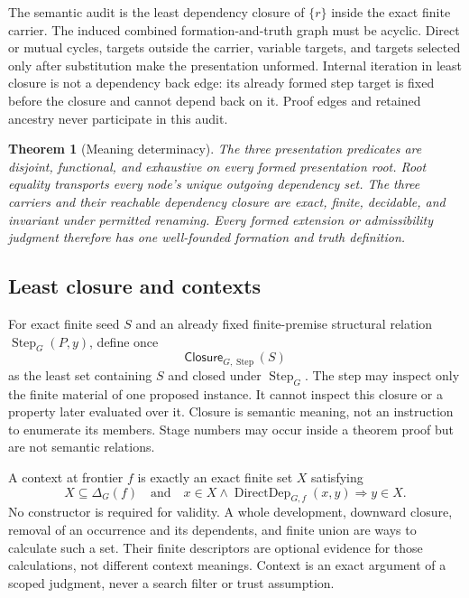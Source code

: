 \documentclass[11pt,twoside]{article}
\newcommand{\Closure}{\mathsf{Closure}}
\newtheorem{theorem}{Theorem}
\begin{document}
The semantic audit is the least dependency closure of \(\{r\}\) inside the exact
finite carrier.  The induced combined formation-and-truth graph must be acyclic.
Direct or mutual cycles, targets outside the carrier, variable targets, and targets
selected only after substitution make the presentation unformed.  Internal
iteration in least closure is not a dependency back edge: its already formed step
target is fixed before the closure and cannot depend back on it.  Proof edges and
retained ancestry never participate in this audit.

\begin{theorem}[Meaning determinacy]\label{thm:meaning}
The three presentation predicates are disjoint, functional, and exhaustive
on every formed presentation root.  Root equality transports every node's unique
outgoing dependency set.  The three carriers and their reachable dependency
closure are exact, finite, decidable, and invariant under permitted renaming.
Every formed extension or admissibility judgment therefore has one well-founded
formation and truth definition.
\end{theorem}

\subsection{Least closure and contexts}

For exact finite seed \(S\) and an already fixed finite-premise structural relation
\(\operatorname{Step}_G(P,y)\), define once
\[
  \Closure_{G,\operatorname{Step}}(S)
\]
as the least set containing \(S\) and closed under
\(\operatorname{Step}_G\).  The step may inspect only the finite material of one
proposed instance.  It cannot inspect this closure or a property later evaluated
over it.  Closure is semantic meaning, not an instruction to enumerate its
members.  Stage numbers may occur inside a theorem proof but are not semantic
relations.

A context at frontier \(f\) is exactly an exact finite set \(X\) satisfying
\[
  X\subseteq\Delta_G(f)
  \quad\text{and}\quad
  x\in X\land\operatorname{DirectDep}_{G,f}(x,y)
  \Longrightarrow y\in X.
\]
No constructor is required for validity.  A whole development, downward closure,
removal of an occurrence and its dependents, and finite union are ways to calculate
such a set.  Their finite descriptors are optional evidence for those calculations,
not different context meanings.  Context is an exact argument of a scoped
judgment, never a search filter or trust assumption.
\end{document}
